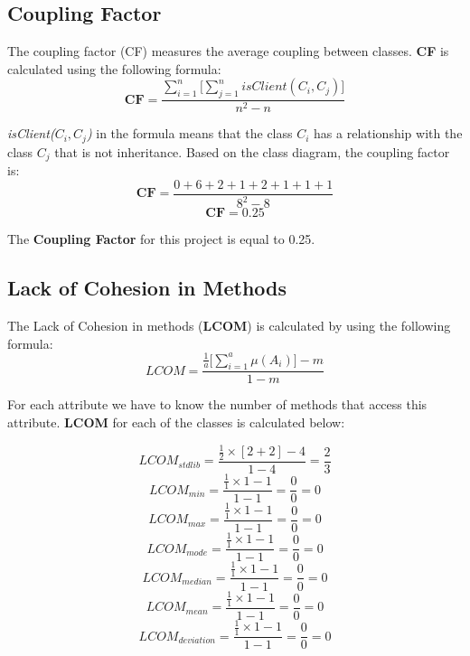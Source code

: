 \documentclass[12pt]{article}
\begin{document}
\subsection{Coupling Factor}

The coupling factor (CF) measures the average coupling between classes. \textbf{CF} is calculated using the following formula:
\begin{equation}
    \textbf{CF} =\frac{\sum^{n}_{i=1}{\Bigg[\sum^{n}_{j=1}{isClient(C_{i},C_{j})\Bigg]}}}{n^2-n}  
\end{equation}
\par 
\textit{isClient($C_{i},C_{j}$)} in the formula means that the class $C_{i}$ has a relationship with the class $C_{j}$ that is not inheritance. Based on the class diagram, the coupling factor is:
\begin{equation}
    \textbf{CF} =\frac{0+6+2+1+2+1+1+1}{8^2-8}  
\end{equation}
\begin{equation}
    \textbf{CF} = 0.25
\end{equation}
\par The \textbf{Coupling Factor} for this project is equal to 0.25.
\subsection{Lack of Cohesion in Methods}
The Lack of Cohesion in methods (\textbf{LCOM}) is calculated by using the following formula:
\begin{equation}
    LCOM =\frac{\frac{1}{a}\Big[\sum^{a}_{i=1}{\mu(A_{i})\big]-m}}{1-m}
\end{equation}

\par For each attribute we have to know the number of methods that access this attribute. \textbf{LCOM} for each of the classes is calculated below:

\begin{equation}
    LCOM_{stdlib} =\frac{\frac{1}{2}\times[2+2]-4}{1-4} = \frac{2}{3}
\end{equation}
\begin{equation}
    LCOM_{min} = \frac{\frac{1}{1}\times1-1}{1-1} = \frac{0}{0} = 0
\end{equation}
\begin{equation}
    LCOM_{max} = \frac{\frac{1}{1}\times1-1}{1-1} = \frac{0}{0} = 0
\end{equation}
\begin{equation}
    LCOM_{mode} = \frac{\frac{1}{1}\times1-1}{1-1} = \frac{0}{0} = 0
\end{equation}
\begin{equation}
    LCOM_{median} = \frac{\frac{1}{1}\times1-1}{1-1} = \frac{0}{0} = 0
\end{equation}
\begin{equation}
    LCOM_{mean} = \frac{\frac{1}{1}\times1-1}{1-1} = \frac{0}{0} = 0
\end{equation}
\begin{equation}
    LCOM_{deviation} = \frac{\frac{1}{1}\times1-1}{1-1} = \frac{0}{0} = 0
\end{equation}
\end{document}

